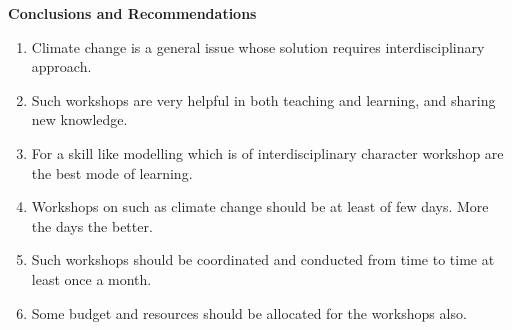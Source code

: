 \documentclass[a4paper,12pt]{report}
\begin{document}
\vspace{3cm}
{\bfseries \Large Conclusions and Recommendations} \vspace{1mm}
\begin{enumerate}
  \item Climate change is a general issue whose solution requires interdisciplinary approach.
\item Such workshops are very helpful in both teaching and learning, and sharing new knowledge.
\item For a skill like modelling which is of interdisciplinary character workshop are the best mode of learning.
\item Workshops on such as climate change should be at least of few days. More the days the better.
\item Such workshops should be coordinated and conducted from time to time at least once a month.
  \item Some budget and resources should be allocated for the workshops also.
\end{enumerate}

\clearpage
\end{document}
